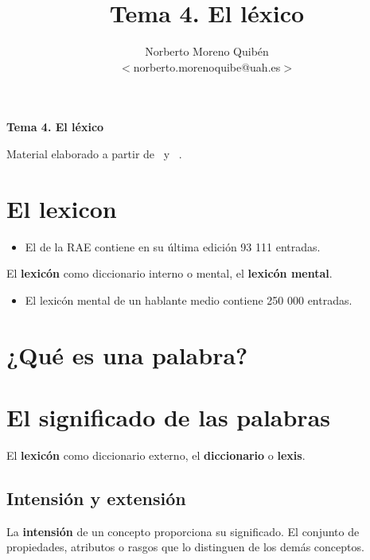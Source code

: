 \documentclass[12pt]{article}
\title{Tema 4. El léxico}
\author{Norberto Moreno Quibén\\
        \small $<$norberto.morenoquibe@uah.es$>$}
\date{}
\begin{document}
\textbf{\Large Tema 4. El léxico}

\tableofcontents

Material elaborado a partir de~\cite{bosque1982sobre-la-teoria,bosque2004combinatoria-y-signi,murphy2010lexicalmeaning,jezek2015the-lexicon-an,pustejovsky2019the-lexicon} y ~\cite[caps. «Lexicología» y «Diccionarios»][]{2016enciclopedia-de-linguistica}.

%
%
\printbibliography

\section{El lexicon}
\begin{itemize}
  \item El \href{https://dle.rae.es/?w=diccionario}{} de la RAE contiene en su última edición 93 111 entradas.
\end{itemize}


El \textbf{lexicón} como diccionario interno o mental, el \textbf{lexicón mental}.
\begin{itemize}
  \item El lexicón mental de un hablante medio contiene 250 000 entradas.
\end{itemize}



\section{¿Qué es una palabra?}
\section{El significado de las palabras}

El \textbf{lexicón} como diccionario externo, el \textbf{diccionario} o \textbf{lexis}.

\subsection{Intensión y extensión}

La \textbf{intensión} de un concepto proporciona su significado. El conjunto de propiedades, atributos o rasgos que lo distinguen de los demás conceptos.
\end{document}

